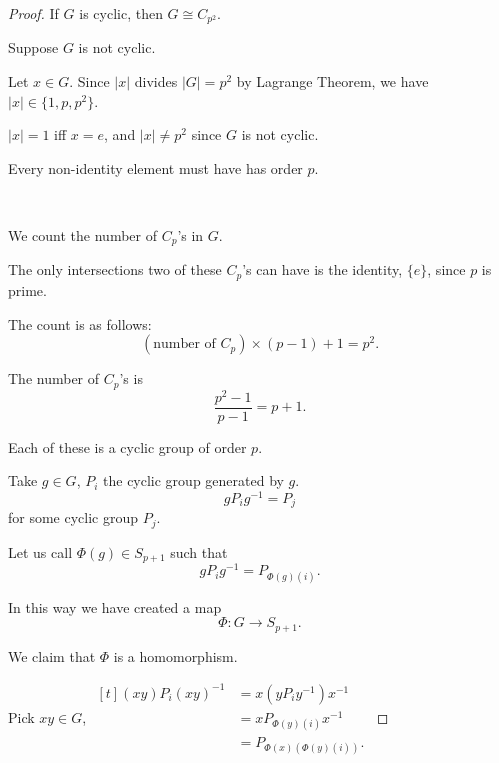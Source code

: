 \begin{proof}
    If $G$ is cyclic, then $G \cong C_{p^2}$.

    Suppose $G$ is not cyclic. 

    Let $x \in G$. Since $|x|$ divides $|G| = p^2$ by Lagrange Theorem, we have $|x| \in \{ 1, p, p^2 \}$.

    $|x| = 1$ iff $x = e$, and $|x| \neq p^2$ since $G$ is not cyclic.

    Every non-identity element must have has order $p$.

    {~~~}

    We count the number of $C_p$'s in $G$.

    The only intersections two of these $C_p$'s can have is the identity, $\{ e \}$, since $p$ is prime.

    The count is as follows: \[
        (\text{number of } C_p) \times (p-1) + 1 = p^2.
    \]

    The number of $C_p$'s is \[
        \frac{p^2 - 1}{p-1} = p + 1.
    \]

    \begin{center}
    \end{center}

    Each of these is a cyclic group of order $p$. 

    Take $g \in G$, $P_i$ the cyclic group generated by $g$. \[
        g P_i g^{-1} = P_j
    \] for some cyclic group $P_j$.

    Let us call $\Phi(g) \in S_{p+1}$ such that \[
        g P_i g^{-1} = P_{\Phi(g)(i)}.
    \]

    In this way we have created a map \[
        \Phi: G \to S_{p+1}.
    \]

    We claim that $\Phi$ is a homomorphism.

    Pick $xy \in G$, $\begin{aligned}[t]
        (xy) P_i (xy)^{-1} &= x(y P_i y^{-1})x^{-1} \\
                           &= x P_{\Phi(y)(i)} x^{-1} \\
                           &= P_{\Phi(x)(\Phi(y)(i))}.
    \end{aligned}$


\end{proof}

